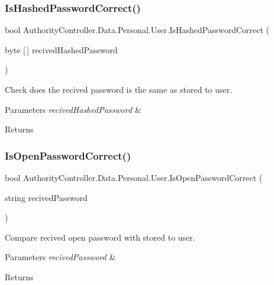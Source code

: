 \subsubsection{\texorpdfstring{Is\+Hashed\+Password\+Correct()}{IsHashedPasswordCorrect()}}
{\footnotesize\ttfamily bool Authority\+Controller.\+Data.\+Personal.\+User.\+Is\+Hashed\+Password\+Correct (\begin{DoxyParamCaption}\item[{byte \mbox{[}$\,$\mbox{]}}]{recived\+Hashed\+Password }\end{DoxyParamCaption})}



Check does the recived password is the same as stored to user. 


\begin{DoxyParams}{Parameters}
{\em recived\+Hashed\+Password} & \\
\hline
\end{DoxyParams}
\begin{DoxyReturn}{Returns}

\end{DoxyReturn}
\mbox{\label{class_authority_controller_1_1_data_1_1_personal_1_1_user_a40e370338936914847b4ca8afb9cfc2f}} 
\subsubsection{\texorpdfstring{Is\+Open\+Password\+Correct()}{IsOpenPasswordCorrect()}}
{\footnotesize\ttfamily bool Authority\+Controller.\+Data.\+Personal.\+User.\+Is\+Open\+Password\+Correct (\begin{DoxyParamCaption}\item[{string}]{recived\+Password }\end{DoxyParamCaption})}



Compare recived open password with stored to user. 


\begin{DoxyParams}{Parameters}
{\em recived\+Password} & \\
\hline
\end{DoxyParams}
\begin{DoxyReturn}{Returns}

\end{DoxyReturn}


